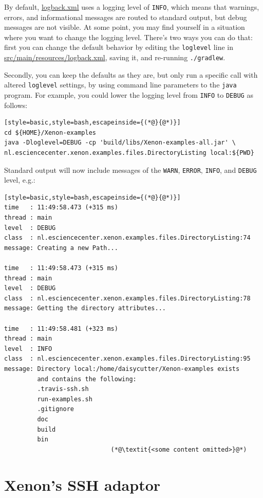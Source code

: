 \documentclass[12pt, a4paper, twoside, openany, titlepage]{book}
\begin{document}
By default, \url{logback.xml} uses a logging level of \texttt{INFO}, which means that warnings, errors, and informational messages are routed to standard output, but debug messages are not visible. At some point, you may find yourself in a situation where you want to change the logging level. There's two ways you can do that: first you can change the default behavior by editing the \texttt{loglevel} line in \url{src/main/resources/logback.xml}, saving it, and re-running \texttt{./gradlew}.

Secondly, you can keep the defaults as they are, but only run a specific call with altered \texttt{loglevel} settings, by using command line parameters to the \texttt{java} program. For example, you could lower the logging level from \texttt{INFO} to \texttt{DEBUG} as follows:

\begin{lstlisting}[style=basic,style=bash,escapeinside={(*@}{@*)}]
cd ${HOME}/Xenon-examples
java -Dloglevel=DEBUG -cp 'build/libs/Xenon-examples-all.jar' \
nl.esciencecenter.xenon.examples.files.DirectoryListing local:${PWD}
\end{lstlisting} %

Standard output will now include messages of the \texttt{WARN}, \texttt{ERROR}, \texttt{INFO}, and \texttt{DEBUG} level, e.g.:
\begin{lstlisting}[style=basic,style=bash,escapeinside={(*@}{@*)}]
time   : 11:49:58.473 (+315 ms)
thread : main
level  : DEBUG
class  : nl.esciencecenter.xenon.examples.files.DirectoryListing:74
message: Creating a new Path...

time   : 11:49:58.473 (+315 ms)
thread : main
level  : DEBUG
class  : nl.esciencecenter.xenon.examples.files.DirectoryListing:78
message: Getting the directory attributes...

time   : 11:49:58.481 (+323 ms)
thread : main
level  : INFO
class  : nl.esciencecenter.xenon.examples.files.DirectoryListing:95
message: Directory local:/home/daisycutter/Xenon-examples exists
         and contains the following:
         .travis-ssh.sh
         run-examples.sh
         .gitignore
         doc
         build
         bin
                             (*@\textit{<some content omitted>}@*)
\end{lstlisting}



\section{Xenon's SSH adaptor}
\end{document}
